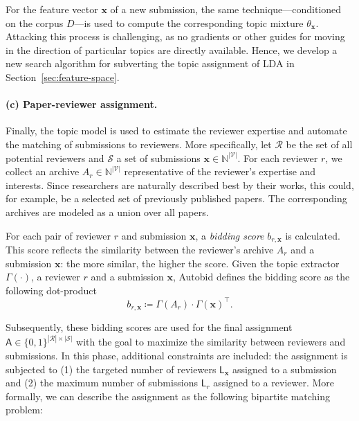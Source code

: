 \documentclass[letterpaper,twocolumn,10pt]{article}
\newcommand{\bow}{\textbf{x}}
\newcommand{\vocabulary}{\mathcal{V}}
\newcommand{\assignment}{\mathsf{A}}
\newcommand{\corpus}{D}
\newcommand{\corpusdoc}{\bow}
\newcommand{\submission}{\bow}
\newcommand{\submissions}{\mathcal{S}}
\newcommand{\reviewersset}{\mathcal{R}}
\newcommand{\reviewer}{r}
\newcommand{\archive}{A}
\newcommand{\reviewerload}{\mathsf{L}_{\reviewer}}
\newcommand{\paperload}{\mathsf{L}_{\submission}}
\newcommand{\bid}{b}
\newcommand{\topicextractor}{\Gamma}
\newcommand{\topicdocumentdist}{\theta}
\begin{document}
For the feature vector $\corpusdoc$ of a new submission, the same technique---conditioned on the corpus $\corpus$---is used to compute the corresponding topic {mixture\EndAccSupp{}} $\topicdocumentdist_\corpusdoc$. Attacking this process is challenging, as no {gradients\EndAccSupp{}} or other guides for moving in the direction of particular topics are directly available. Hence, we develop a new search algorithm for {subverting\EndAccSupp{}} the topic assignment of \ac{LDA} in Section~\ref{sec:feature-space}.

\paragraph{(c) Paper-reviewer assignment.}
\label{sec:background:assignment}
Finally, the topic model is used to estimate the reviewer expertise and automate the matching of submissions to reviewers. More specifically, let $\reviewersset$ be the set of all potential reviewers and $\submissions$ a set of submissions $\submission \in \mathbb{N}^{|\vocabulary|}$. For each reviewer $\reviewer$, we collect an archive $\archive_\reviewer \in \mathbb{N}^{|\vocabulary|}$ representative of the reviewer's expertise and interests. Since researchers are naturally described best by their works, this could, for example, be a selected set of previously published papers. The corresponding archives are modeled as a union over all papers.

For each pair of reviewer $\reviewer$ and submission $\submission$, a \emph{bidding score} $\bid_{\reviewer, \submission}$ is calculated. This score reflects the similarity between the reviewer's archive $\archive_\reviewer$ and a submission $\submission$: the more similar, the higher the score. Given the topic extractor $\topicextractor(\cdot)$, a reviewer $\reviewer$ and a submission $\submission$, Autobid defines the {bidding\EndAccSupp{}} score as the following dot-product
\begin{equation}
\bid_{\reviewer,\submission} \coloneqq \topicextractor(\archive_\reviewer) \cdot \topicextractor(\submission)^\top.
\end{equation}

Subsequently, these {bidding\EndAccSupp{}} scores are used for the final assignment $\assignment \in \{0,1\}^{|\reviewersset|\times|\submissions|}$ with the goal to maximize the similarity between reviewers and submissions.
In this phase, additional constraints are included: the assignment is subjected to (1) the targeted number of reviewers $\paperload$ assigned to a submission and (2) the maximum number of submissions $\reviewerload$ assigned to a reviewer.
More formally, we can describe the assignment as the following bipartite matching problem:
\end{document}
